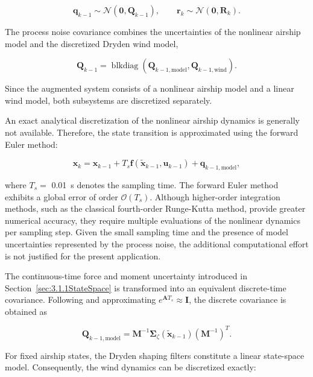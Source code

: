 \begin{equation}
	\bm{q}_{k-1}
	\sim
	\mathcal{N}(\bm{0},\bm{Q}_{k-1}),
	\qquad
	\bm{r}_k
	\sim
	\mathcal{N}(\bm{0},\bm{R}_k).
\end{equation}

The process noise covariance combines the uncertainties of the nonlinear airship model and the discretized Dryden wind model,

\begin{equation}
	\bm{Q}_{k-1}
	=
	\operatorname{blkdiag}
	\left(
	\bm{Q}_{k-1, \mathrm{model}},
	\bm{Q}_{k-1, \mathrm{wind}}
	\right).
\end{equation}

Since the augmented system consists of a nonlinear airship model and a linear wind model, both subsystems are discretized separately.

An exact analytical discretization of the nonlinear airship dynamics is generally not available. Therefore, the state transition is approximated using the forward Euler method:

\begin{equation}
	\bm{x}_k = \bm{x}_{k-1} + T_s \bm{f}(\tilde{\bm{x}}_{k-1}, \bm{u}_{k-1}) + \bm{q}_{k-1, \mathrm{model}},
\end{equation}

where $T_s = $ \SI{0.01}{s} denotes the sampling time. The forward Euler method exhibits a global error of order $\mathcal{O}(T_s)$. Although higher-order integration methods, such as the classical fourth-order Runge-Kutta method, provide greater numerical accuracy, they require multiple evaluations of the nonlinear dynamics per sampling step. Given the small sampling time and the presence of model uncertainties represented by the process noise, the additional computational effort is not justified for the present application.

The continuous-time force and moment uncertainty introduced in Section~\ref{sec:3.1.1StateSpace} is transformed into an equivalent discrete-time covariance. Following \cite{BarShalom2001Discretization} and approximating $e^{\bm{A}T_s}\approx\bm{I}$, the discrete covariance is obtained as

\begin{equation}
	\bm{Q}_{k-1, \mathrm{model}}
	=
	\bm{M}^{-1}
	\bm{\Sigma}_{\zeta}(\tilde{\bm{x}}_{k-1})
	\left(\bm{M}^{-1}\right)^T.
\end{equation}

For fixed airship states, the Dryden shaping filters constitute a linear state-space model. Consequently, the wind dynamics can be discretized exactly:

